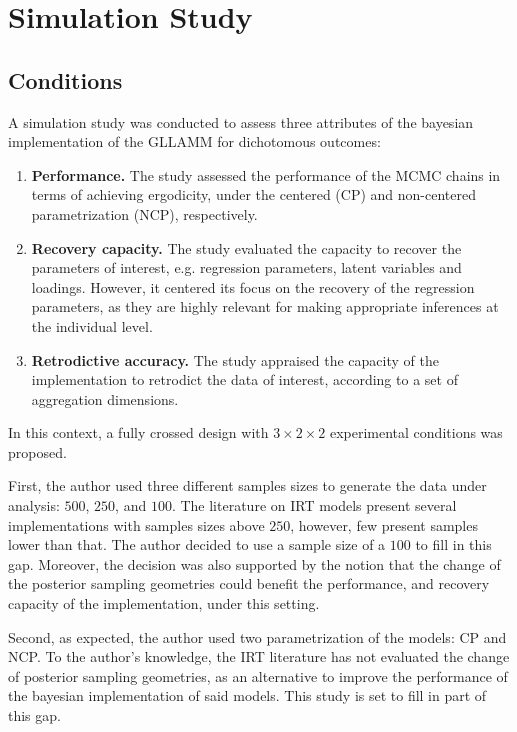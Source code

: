 \chapter{Simulation Study} \label{chap:simulation}

\section{Conditions} \label{sec:conditions}

A simulation study was conducted to assess three attributes of the bayesian implementation of the GLLAMM for dichotomous outcomes:
%
\begin{enumerate}
	\item \textbf{Performance.} The study assessed the performance of the MCMC chains in terms of achieving ergodicity, under the centered (CP) and non-centered parametrization (NCP), respectively.
	\item \textbf{Recovery capacity.} The study evaluated the capacity to recover the parameters of interest, e.g. regression parameters, latent variables and loadings. However, it centered its focus on the recovery of the regression parameters, as they are highly relevant for making appropriate inferences at the individual level.
	\item \textbf{Retrodictive accuracy.} The study appraised the capacity of the implementation to retrodict the data of interest, according to a set of aggregation dimensions.
\end{enumerate} 

\noindent In this context, a fully crossed design with $3 \times 2 \times 2$ experimental conditions was proposed. 

First, the author used three different samples sizes to generate the data under analysis: $500$, $250$, and $100$. The literature on IRT models present several implementations with samples sizes above $250$, however, few present samples lower than that. The author decided to use a sample size of a $100$ to fill in this gap. Moreover, the decision was also supported by the notion that the change of the posterior sampling geometries could benefit the performance, and recovery capacity of the implementation, under this setting.

Second, as expected, the author used two parametrization of the models: CP and NCP. To the author's knowledge, the IRT literature has not evaluated the change of posterior sampling geometries, as an alternative to improve the performance of the bayesian implementation of said models. This study is set to fill in part of this gap.

